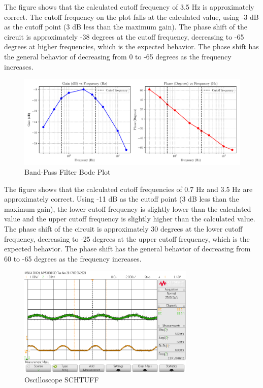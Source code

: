 \documentclass[CMPE]{KGCOEReport}
\begin{document}
The figure shows that the calculated cutoff frequency of 3.5 Hz is approximately correct. The cutoff frequency on the plot falls at the calculated value, using -3 dB as the cutoff point (3 dB less than the maximum gain). The phase shift of the circuit is approximately -38 degrees at the cutoff frequency, decreasing to -65 degrees at higher frequencies, which is the expected behavior. The phase shift has the general behavior of decreasing from 0 to -65 degrees as the frequency increases.

\begin{figure}[H]
    \centering
    \includegraphics[width=1\textwidth]{band_pass_plot.pdf}
    \caption{Band-Pass Filter Bode Plot}
    \label{fig:bandPassBode}
\end{figure}

The figure shows that the calculated cutoff frequencies of 0.7 Hz and 3.5 Hz are approximately correct. Using -11 dB as the cutoff point (3 dB less than the maximum gain), the lower cutoff frequency is slightly lower than the calculated value and the upper cutoff frequency is slightly higher than the calculated value. The phase shift of the circuit is approximately 30 degrees at the lower cutoff frequency, decreasing to -25 degrees at the upper cutoff frequency, which is the expected behavior. The phase shift has the general behavior of decreasing from 60 to -65 degrees as the frequency increases.

\begin{figure}[H]
    \centering
    \includegraphics[width=0.75\textwidth]{200mHz.png}
    \caption{Oscilloscope SCHTUFF}
    \label{fig:200mHzCapture}
\end{figure}
\end{document}
